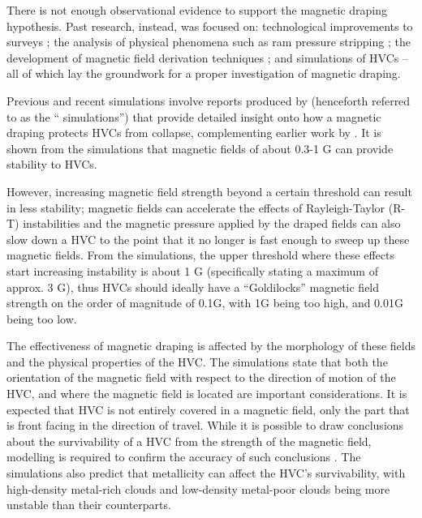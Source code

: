 There is not enough observational evidence to support the magnetic draping hypothesis. Past research, instead, was focused on: technological improvements to surveys \citep{ID52, ID71, ID1, ID3, ID6, ID18, ID43, ID44, ID45}; the analysis of physical phenomena such as ram pressure stripping \citep{ID11, ID23, ID33}; the development of magnetic field derivation techniques \citep{ID5, ID23, ID30, ID11, ID26, ID21}; and simulations of HVCs \citep{ID13, ID23, ID24, ID33, ID34} – all of which lay the groundwork for a proper investigation of magnetic draping.


Previous and recent simulations involve reports produced by \cite{ID23, ID24, ID33} (henceforth referred to as the “\citeauthor{ID23} simulations”) that provide detailed insight onto how a magnetic draping protects HVCs from collapse, complementing earlier work by \cite{ID13, ID11}. It is shown from the \citeauthor{ID23} simulations that magnetic fields of about 0.3-1 {\textmu}G can provide stability to HVCs.


However, increasing magnetic field strength beyond a certain threshold can result in less stability; magnetic fields can accelerate the effects of Rayleigh-Taylor (R-T) instabilities and the magnetic pressure applied by the draped fields can also slow down a HVC to the point that it no longer is fast enough to sweep up these magnetic fields. From the \citeauthor{ID23} simulations, the upper threshold where these effects start increasing instability is about 1 {\textmu}G (specifically stating a maximum of approx. 3 {\textmu}G), thus HVCs should ideally have a “Goldilocks” magnetic field strength on the order of magnitude of 0.1{\textmu}G, with 1{\textmu}G being too high, and 0.01{\textmu}G being too low.


The effectiveness of magnetic draping is affected by the morphology of these fields and the physical properties of the HVC. The \citeauthor{ID23} simulations state that both the orientation of the magnetic field with respect to the direction of motion of the HVC, and where the magnetic field is located are important considerations. It is expected that HVC is not entirely covered in a magnetic field, only the part that is front facing in the direction of travel. While it is possible to draw conclusions about the survivability of a HVC from the strength of the magnetic field, modelling is required to confirm the accuracy of such conclusions \citep{ID5}. The \citeauthor{ID23} simulations also predict that metallicity can affect the HVC's survivability, with high-density metal-rich clouds and low-density metal-poor clouds being more unstable than their counterparts.


